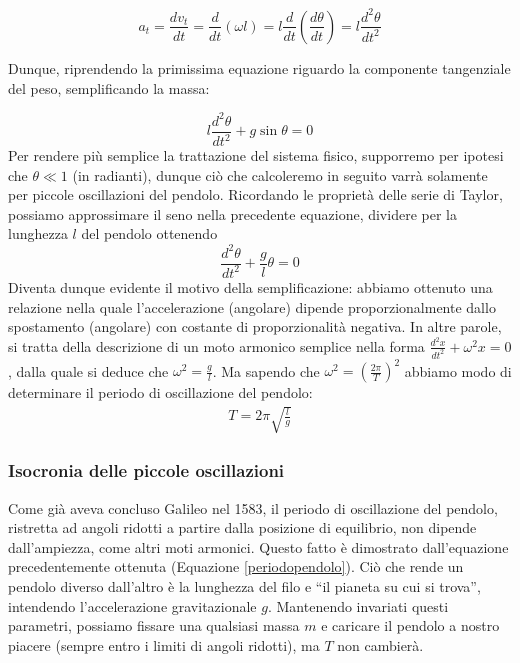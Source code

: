 \[ a_t = \frac{dv_t}{dt} = \frac{d}{dt} (\omega l) = l \frac{d}{dt}\left(\frac{d\theta}{dt}\right) = l\frac{d^2\theta}{dt^2} \]

\noindent Dunque, riprendendo la primissima equazione riguardo la componente
tangenziale del peso, semplificando la massa:

\[ l\frac{d^2\theta}{dt^2} + g\sin\theta = 0 \]
Per rendere più semplice la trattazione del sistema fisico, supporremo
per ipotesi che $\theta\ll 1$ (in radianti), dunque ciò che calcoleremo
in seguito varrà solamente per piccole oscillazioni del pendolo.
Ricordando le proprietà delle serie di Taylor, possiamo approssimare
il seno nella precedente equazione, dividere per la lunghezza $l$ del
pendolo ottenendo
\[ \frac{d^2\theta}{dt^2} + \frac{g}{l}\theta = 0 \]
Diventa dunque evidente il motivo della semplificazione: abbiamo ottenuto
una relazione nella quale l'accelerazione (angolare) dipende proporzionalmente
dallo spostamento (angolare) con costante di proporzionalità negativa.
In altre parole, si tratta della descrizione di un moto armonico semplice
nella forma $\frac{d^2x}{dt^2} + \omega^2 x = 0$, dalla quale si deduce
che $\omega^2 = \frac{g}{l}$. Ma sapendo che $\omega^2 = (\frac{2\pi}{T})^2$
abbiamo modo di determinare il periodo di oscillazione del pendolo:
\begin{align}
    T = 2\pi\sqrt{\frac{l}{g}}
    \label{periodopendolo}
\end{align}


\subsubsection*{Isocronia delle piccole oscillazioni}
Come già aveva concluso Galileo nel 1583, il periodo di oscillazione
del pendolo, ristretta ad angoli ridotti a partire dalla posizione
di equilibrio, non dipende dall'ampiezza, come altri moti armonici.
Questo fatto è dimostrato dall'equazione precedentemente ottenuta
(Equazione \ref{periodopendolo}). Ciò che rende un pendolo diverso
dall'altro è la lunghezza del filo e ``il pianeta su cui si trova'',
intendendo l'accelerazione gravitazionale $g$. Mantenendo invariati
questi parametri, possiamo fissare una qualsiasi massa $m$ e caricare
il pendolo a nostro piacere (sempre entro i limiti di angoli ridotti),
ma $T$ non cambierà.

